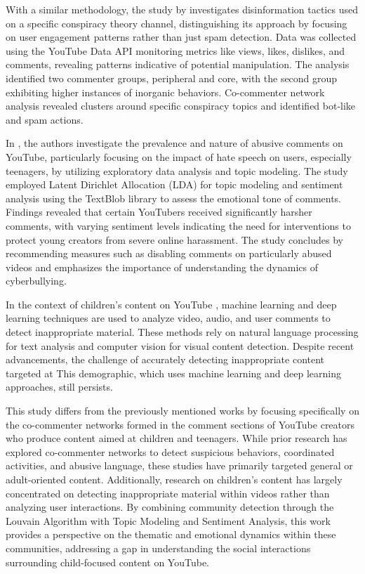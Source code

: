\documentclass[sigconf]{acmart}
\begin{document}
With a similar methodology, the study by \cite{hussain2018analyzing} investigates
disinformation tactics used on a specific conspiracy theory channel, distinguishing its approach by 
focusing on user engagement patterns rather than just spam detection. Data was collected using the 
YouTube Data API monitoring metrics like views, likes, dislikes, and comments, revealing patterns 
indicative of potential manipulation. The analysis identified two commenter groups, peripheral and 
core, with the second group exhibiting higher instances of inorganic behaviors. Co-commenter network 
analysis revealed clusters around specific conspiracy topics and identified bot-like and spam actions. 

In \cite{shekar2021}, the authors investigate the prevalence and nature of abusive comments on YouTube, 
particularly focusing on the impact of hate speech on users, especially teenagers, by utilizing 
exploratory data analysis and topic modeling. 
The study employed Latent Dirichlet Allocation (LDA) for topic modeling and sentiment analysis using 
the TextBlob library to assess the emotional tone of comments. Findings revealed that certain 
YouTubers received significantly harsher comments, with varying sentiment levels indicating the 
need for interventions to protect young creators from severe online harassment. 
The study concludes by recommending measures such as disabling comments on particularly abused 
videos and emphasizes the importance of understanding the dynamics of cyberbullying.

In the context of children's content on YouTube \cite{app13064044}, machine learning and deep learning 
techniques are used to analyze video, audio, and user comments to detect inappropriate 
material. These methods rely on natural language processing for text analysis and computer 
vision for visual content detection. 
Despite recent advancements, the challenge of accurately detecting inappropriate content targeted at 
This demographic, which uses machine learning and deep learning approaches, still persists.

This study differs from the previously mentioned works by focusing specifically on the co-commenter 
networks formed in the comment sections of YouTube creators who produce content aimed at children and teenagers. 
While prior research has explored co-commenter networks to detect suspicious behaviors, coordinated activities, 
and abusive language, these studies have primarily targeted general or adult-oriented content. 
Additionally, research on children's content has largely concentrated on detecting inappropriate 
material within videos rather than analyzing user interactions. By combining community detection 
through the Louvain Algorithm with Topic Modeling and Sentiment Analysis, this work provides a 
perspective on the thematic and emotional dynamics within these communities, 
addressing a gap in understanding the social interactions surrounding child-focused content on YouTube.
\end{document}
